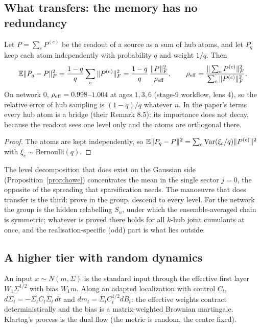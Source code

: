 \subsection{What transfers: the memory has no redundancy}
\begin{proposition}\label{prop:redundancy}
Let $P=\sum_cP^{(c)}$ be the readout of a source as a sum of hub atoms, and let $P_q$ keep each atom independently with probability $q$ and
weight $1/q$. Then
\[
\mathbb E\|P_q-P\|_F^2=\frac{1-q}q\sum_c\|P^{(c)}\|_F^2=\frac{1-q}{q}\,\frac{\|P\|_F^2}{\rho_{\rm eff}},\qquad\rho_{\rm eff}=\frac{\|\sum_cP^{(c)}\|_F^2}{\sum_c\|P^{(c)}\|_F^2}.
\]
On network $0$, $\rho_{\rm eff}=0.998$--$1.004$ at ages $1,3,6$ (stage-9 workflow, lens 4), so the relative error of hub sampling is $(1-q)/q$
whatever $n$. In the paper's terms every hub atom is a bridge (their Remark 8.5): its importance does not decay, because the readout
sees one level only and the atoms are orthogonal there.
\end{proposition}
\begin{proof}
The atoms are kept independently, so $\mathbb E\|P_q-P\|^2=\sum_c\operatorname{Var}(\xi_c/q)\|P^{(c)}\|^2$ with $\xi_c\sim\mathrm{Bernoulli}(q)$.
\end{proof}
The level decomposition that does exist on the Gaussian side (Proposition~\ref{prop:howe}) concentrates the mean in the single sector
$j=0$, the opposite of the spreading that sparsification needs. The manoeuvre that does transfer is the third: prove in the group,
descend to every level. For the network the group is the hidden relabelling $S_n$, under which the ensemble-averaged chain is symmetric;
whatever is proved there holds for all $k$-hub joint cumulants at once, and the realisation-specific (odd) part is what lies outside.

\subsection{A higher tier with random dynamics}
\begin{proposition}\label{prop:flow}
An input $x\sim N(m,\Sigma)$ is the standard input through the effective first layer $W_1\Sigma^{1/2}$ with bias $W_1m$. Along an adapted
localization with control $C_t$, $d\Sigma_t=-\Sigma_tC_t\Sigma_t\,dt$ and $dm_t=\Sigma_tC_t^{1/2}dB_t$: the effective weights contract deterministically and the
bias is a matrix-weighted Brownian martingale. Klartag's process is the dual flow (the metric is random, the centre fixed).
\end{proposition}

